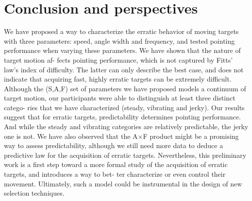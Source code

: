 \section{Conclusion and perspectives}
We have proposed a way to characterize the erratic behavior of moving targets with
three parameters: speed, angle width and frequency, and tested pointing performance
when varying these parameters. We have shown that the nature of target motion af-
fects pointing performance, which is not captured by Fitts’ law’s index of difficulty.
The latter can only describe the best case, and does not indicate that acquiring fast,
highly erratic targets can be extremely difficult.
Although the (S,A,F) set of parameters we have proposed models a continuum of
target motion, our participants were able to distinguish at least three distinct catego-
ries that we have characterized (steady, vibrating and jerky). Our results suggest that
for erratic targets, predictability determines pointing performance. And while the
steady and vibrating categories are relatively predictable, the jerky one is not.
We have also observed that the A×F product might be a promising way to assess
predictability, although we still need more data to deduce a predictive law for the
acquisition of erratic targets. Nevertheless, this preliminary work is a first step toward
a more formal study of the acquisition of erratic targets, and introduces a way to bet-
ter characterize or even control their movement. Ultimately, such a model could be
instrumental in the design of new selection techniques.



\clearpage

